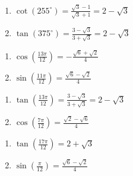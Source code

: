 \begin{multicols}{2}

\begin{enumerate}

\setcounter{enumi}{\value{HW}}

\item  $\cot(255^{\circ}) = \frac{\sqrt{3}-1}{\sqrt{3}+1} = 2-\sqrt{3}$
\item  $\tan(375^{\circ}) = \frac{3-\sqrt{3}}{3+\sqrt{3}} = 2-\sqrt{3}$

\setcounter{HW}{\value{enumi}}

\end{enumerate}

\end{multicols}

\begin{multicols}{2}

\begin{enumerate}

\setcounter{enumi}{\value{HW}}

\item  $\cos\left(\frac{13\pi}{12}\right) = -\frac{\sqrt{6}+\sqrt{2}}{4}$
\item  $\sin\left(\frac{11\pi}{12}\right) = \frac{\sqrt{6} - \sqrt{2}}{4}$

\setcounter{HW}{\value{enumi}}

\end{enumerate}

\end{multicols}

\begin{multicols}{2}

\begin{enumerate}

\setcounter{enumi}{\value{HW}}

\item  $\tan\left(\frac{13\pi}{12}\right) = \frac{3-\sqrt{3}}{3+\sqrt{3}} = 2-\sqrt{3}$
\item $\cos \left( \frac{7\pi}{12} \right) = \frac{\sqrt{2} - \sqrt{6}}{4}$

\setcounter{HW}{\value{enumi}}

\end{enumerate}

\end{multicols}

\begin{multicols}{2}

\begin{enumerate}

\setcounter{enumi}{\value{HW}}

\item $\tan \left( \frac{17\pi}{12} \right) = 2 + \sqrt{3}$
\item $\sin \left( \frac{\pi}{12} \right) = \frac{\sqrt{6} - \sqrt{2}}{4}$

\setcounter{HW}{\value{enumi}}

\end{enumerate}

\end{multicols}

